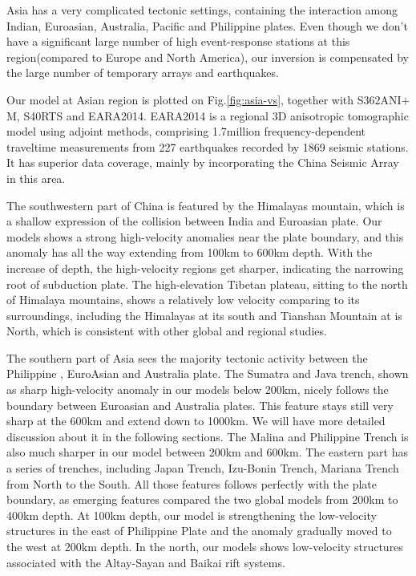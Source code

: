 \documentclass[extra,mreferee]{gji}
\begin{document}
Asia has a very complicated tectonic settings, containing
the interaction among Indian, Euroasian, Australia, Pacific and Philippine
plates. Even though we don't have a significant large number of high
event-response stations at this region(compared to Europe and North
America), our inversion is compensated by the large number of temporary
arrays and earthquakes.

Our model at Asian region is plotted on Fig.\ref{fig:asia-vs},
together with S362ANI$+$M, S40RTS and EARA2014\cite{chen2015multiparameter}.
EARA2014 is a regional 3D anisotropic tomographic model using adjoint
methods, comprising 1.7million frequency-dependent traveltime
measurements from 227 earthquakes recorded by 1869 seismic stations.
It has superior data coverage, mainly by incorporating the China
Seismic Array in this area.

The southwestern part of China is featured by the Himalayas mountain,
which is 
a shallow expression of the collision between India and Euroasian plate. Our
models shows a strong high-velocity anomalies near the plate boundary, and this
anomaly has all the way extending from 100km to 600km depth. With the increase
of depth, the high-velocity regions get sharper, indicating the narrowing
root of subduction plate. The high-elevation Tibetan plateau, sitting to
the north of Himalaya mountains, shows a relatively low velocity
comparing to its surroundings, including the Himalayas at its south and
Tianshan Mountain at is North, which is consistent with other global
and regional studies.

The southern part of Asia sees the majority tectonic activity between the Philippine
, EuroAsian and Australia plate. The Sumatra and Java trench, shown as sharp high-velocity
anomaly in our models below 200km, nicely follows the boundary between Euroasian
and Australia plates. This feature stays still very sharp at the 600km and extend
down to 1000km. We will have more detailed discussion about it in the following sections.
The Malina and Philippine Trench is also much sharper in our model between 200km and
600km.
The eastern part has a series of trenches, including Japan Trench, Izu-Bonin Trench,
Mariana Trench from North to the South. All those features follows perfectly with
the plate boundary, as emerging features compared the two global models from 200km
to 400km depth. At 100km depth, our model is strengthening the low-velocity structures
in the east of Philippine Plate and the anomaly gradually moved to the west at 200km
depth. In the north, our models shows low-velocity structures associated
with the Altay-Sayan and Baikai rift systems.
\end{document}
